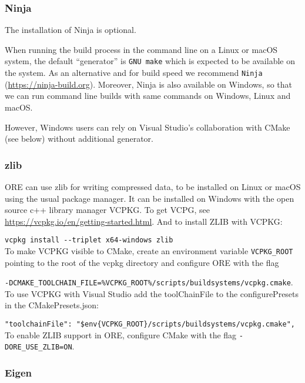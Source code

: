 \subsubsection*{Ninja}

The installation of Ninja is optional.

When running the build process in the command line on a Linux or macOS system, the default ``generator'' is {\tt GNU make} which is
expected to be available on the system. As an alternative and for build speed we recommend {\tt Ninja} (\url{https://ninja-build.org}).
Moreover, Ninja is also available on Windows, so that we can run command line builds with same commands on Windows, Linux and macOS.

However, Windows users can rely on Visual Studio's collaboration with CMake (see below) without additional generator.

\subsubsection*{zlib}

ORE can use zlib for writing compressed data, to be installed on Linux or macOS using the usual package manager.
It can be installed on Windows with the open source c++ library manager VCPKG.
To get VCPG, see \url{https://vcpkg.io/en/getting-started.html}. And to install ZLIB with VCPKG:

\medskip
{\tt vcpkg install -{}-triplet x64-windows zlib} \\

\medskip
To make VCPKG visible to CMake, create an environment variable {\tt VCPKG\_ROOT} pointing to the root of the vcpkg directory
and configure ORE with the flag

\medskip
{\tt -DCMAKE\_TOOLCHAIN\_FILE=\%VCPKG\_ROOT\%/scripts/buildsystems/vcpkg.cmake}. \\

\medskip
To use VCPKG with Visual Studio add the toolChainFile to the configurePresets in the CMakePresets.json:

\medskip
{\tt "toolchainFile": "\$env\{VCPKG\_ROOT\}/scripts/buildsystems/vcpkg.cmake",}\\

\medskip
To enable ZLIB support in ORE, configure CMake with the flag {\tt -DORE\_USE\_ZLIB=ON}.

\subsubsection*{Eigen}

